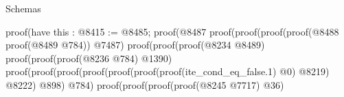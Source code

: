\begin{lexlean}{Schemas}
\begin{coremodule}
                                                                                                  proof(have this : @8415 := @8485;
                                                                                                    proof(@8487
                                                                                                        proof(proof(proof(proof(@8488
                                                                                                                  proof(@8489
                                                                                                                      @784))
                                                                                                                @7487)
                                                                                                              proof(proof(proof(@8234
                                                                                                                      @8489)
                                                                                                                    proof(proof(proof(@8236
                                                                                                                            @784)
                                                                                                                          @1390)
                                                                                                                        proof(proof(proof(proof(proof(proof(proof(ite_cond_eq_false.{1})
                                                                                                                                      @0)
                                                                                                                                    @8219)
                                                                                                                                  @8222)
                                                                                                                                @898)
                                                                                                                              @784)
                                                                                                                            proof(proof(proof(proof(@8245
                                                                                                                                      @7717)
                                                                                                                                    @36)

\end{coremodule}
\end{lexlean}
